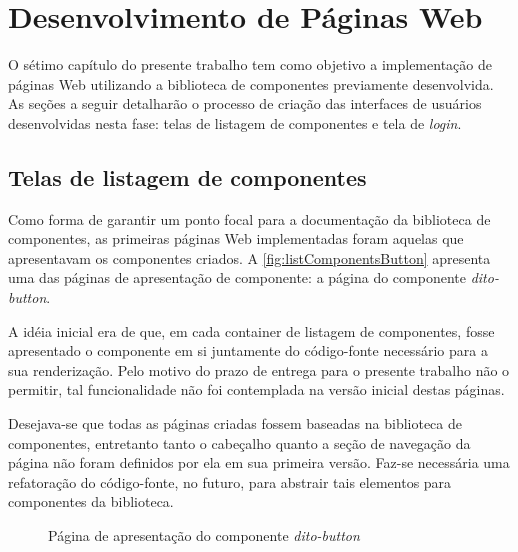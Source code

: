 
\chapter{Desenvolvimento de Páginas Web}
\label{chap:devWeb}

O sétimo capítulo do presente trabalho tem como objetivo a implementação de páginas Web utilizando a biblioteca de componentes previamente desenvolvida. As seções a seguir detalharão o processo de criação das interfaces de usuários desenvolvidas nesta fase: telas de listagem de componentes e tela de \textit{login}.

\section{Telas de listagem de componentes}
\label{sec:listaComponentes}

Como forma de garantir um ponto focal para a documentação da biblioteca de componentes, as primeiras páginas Web implementadas foram aquelas que apresentavam os componentes criados. A \autoref{fig:listComponentsButton} apresenta uma das páginas de apresentação de componente: a página do componente \textit{dito-button}.

A idéia inicial era de que, em cada container de listagem de componentes, fosse apresentado o componente em si juntamente do código-fonte necessário para a sua renderização. Pelo motivo do prazo de entrega para o presente trabalho não o permitir, tal funcionalidade não foi contemplada na versão inicial destas páginas.

Desejava-se que todas as páginas criadas fossem baseadas na biblioteca de componentes, entretanto tanto o cabeçalho quanto a seção de navegação da página não foram definidos por ela em sua primeira versão. Faz-se necessária uma refatoração do código-fonte, no futuro, para abstrair tais elementos para componentes da biblioteca.

\begin{figure}
  \begin{center}
	\end{center}
  \caption{Página de apresentação do componente \textit{dito-button}}
  \label{fig:listComponentsButton}
\end{figure}

